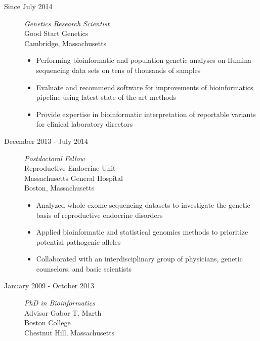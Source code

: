 \documentclass[]{article}
\begin{document}
\begin{description}
\item[Since July 2014] 
\noindent \emph{Genetics Research Scientist}\\
Good Start Genetics\\
Cambridge, Massachusetts

\begin{itemize}
  \item Performing bioinformatic and population genetic analyses on Ilumina sequencing data sets on tens of thousands of samples
  \item Evaluate and recommend software for improvements of bioinformatics pipeline using latest  state-of-the-art methods
  \item Provide expertise in bioinformatic interpretation of reportable variants for clinical laboratory directors
\end{itemize}



\item[December 2013 - July 2014]
\noindent \emph{Postdoctoral Fellow}\\
Reproductive Endocrine Unit\\
Massachusetts General Hospital\\
Boston, Massachusetts

\begin{itemize}
	\item Analyzed whole exome sequencing datasets to investigate the  genetic basis of reproductive endocrine disorders
	\item Applied bioinformatic and statistical genomics methods to prioritize potential pathogenic alleles
	\item Collaborated with an interdisciplinary group of physicians, genetic counselors, and basic scientists
\end{itemize}
\newpage

\item[January 2009 - October 2013]
\noindent \emph{PhD in Bioinformatics}\\
\noindent Advisor Gabor T. Marth\\
Boston College \\
Chestnut Hill, Massachusetts


\end{description}
\end{document}
